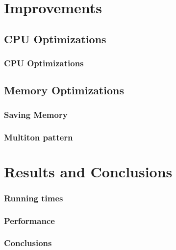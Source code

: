 \documentclass[]{beamer}
\begin{document}
\section{Improvements}
\subsection{CPU Optimizations}

\begin{frame}
	\frametitle{CPU Optimizations}
\end{frame}

\subsection{Memory Optimizations}

\begin{frame}
	\frametitle{Saving Memory}
\end{frame}
\begin{frame}
	\frametitle{Multiton pattern}
\end{frame}

\section{Results and Conclusions}

\begin{frame}
	\frametitle{Running times}
\end{frame}

\begin{frame}
	\frametitle{Performance}
\end{frame}

\begin{frame}
	\frametitle{Conclusions}
\end{frame}
\end{document}
